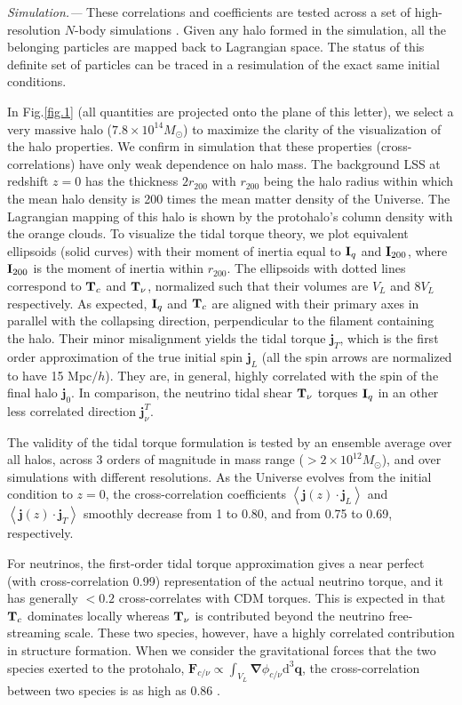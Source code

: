 \documentclass[aps,prd,twocolumn,amsmath,amssymb,amsfont,superscriptaddress,nofootinbib]{revtex4-1}
\newcommand{\bs}{\boldsymbol}
\newcommand{\diff}{{\mathrm d}}
\newcommand{\T}{\bold{T}}
\newcommand{\I}{\bold{I}}
\newcommand{\spin}{\bs{j}}
\begin{document}
\textit{Simulation.---}
These correlations and coefficients are tested across a set of high-resolution $N$-body simulations \citep{2018ApJS..237...24Y}. 
Given any halo formed in the simulation, all the belonging particles are mapped back to Lagrangian space. 
The status of this definite set of particles can be traced in a resimulation of the exact same initial conditions.

In Fig.\ref{fig.1} (all quantities are projected onto the plane of this letter), 
we select a very massive halo ($7.8\times 10^{14}M_\odot$) to maximize the clarity of the visualization of the halo properties.
We confirm in simulation that these properties (cross-correlations) have only weak dependence on halo mass. 
The background LSS at redshift $z=0$ has the thickness $2r_{200}$ with $r_{200}$ being the halo radius within which the mean halo density is 200 times the mean matter density of the Universe.
The Lagrangian mapping of this halo is shown by the protohalo's column density with the orange clouds.
To visualize the tidal torque theory, we plot equivalent ellipsoids (solid curves) with their moment of inertia equal to $\I_q$ and 
$\I_{200}$, where $\I_{200}$ is the moment of inertia within $r_{200}$. 
The ellipsoids with dotted lines correspond to $\T_c$ and $\T_\nu$, normalized such that their volumes are $V_L$ and $8V_L$ respectively. 
As expected, $\I_q$ and $\T_c$ are aligned with their primary axes in parallel with the collapsing direction,  perpendicular to the filament containing the halo. 
Their minor misalignment yields the tidal torque $\spin_T$, which is the first order approximation of the true initial spin $\spin_L$ (all the spin arrows are normalized to have 15 Mpc$/h$). 
They are, in general, highly correlated with the spin of the final halo $\spin_0$.
In comparison, the neutrino tidal shear $\T_\nu$ torques $\I_q$ in an other less correlated direction $\spin^T_\nu$.

The validity of the tidal torque formulation is tested by an ensemble average over all halos, 
across 3 orders of magnitude in mass range ($>2\times10^{12}M_\odot$), and over simulations with different resolutions.
As the Universe evolves from the initial condition to $z=0$, the cross-correlation coefficients $\left\langle \spin(z) \cdot \spin_L \right\rangle$ and
$\left\langle \spin(z) \cdot \spin_T \right\rangle$ smoothly decrease from 1 to 0.80, and
from 0.75 to 0.69, respectively.

For neutrinos, the first-order tidal torque approximation gives a near perfect (with cross-correlation 0.99) representation of the actual neutrino torque, and it has generally $<0.2$ cross-correlates with CDM torques. This is expected in that $\T_c$ dominates locally  whereas $\T_\nu$ is contributed beyond the neutrino free-streaming scale. These two species, however, have a highly correlated contribution in structure formation. When we consider the gravitational forces that the two species exerted to the protohalo, $\bs{F}_{c/\nu}\propto\int_{V_L}\bs{\nabla}\phi_{c/\nu}\diff^3\bs{q}$, the cross-correlation between two species is as high as 0.86 .
\end{document}
